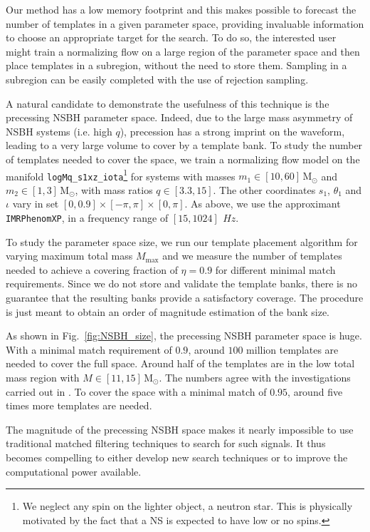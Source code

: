 \documentclass[twocolumn,showpacs,preprintnumbers,nofootinbib,prd,
superscriptaddress,10pt]{revtex4-2}
\begin{document}
Our method has a low memory footprint and this makes possible to forecast the number of templates in a given parameter space, providing invaluable information to choose an appropriate target for the search.
To do so, the interested user might train a normalizing flow on a large region of the parameter space and then place templates in a subregion, without the need to store them. Sampling in a subregion can be easily completed with the use of rejection sampling.

A natural candidate to demonstrate the usefulness of this technique is the precessing NSBH parameter space.
Indeed, due to the large mass asymmetry of NSBH systems (i.e. high $q$), precession has a strong imprint on the waveform, leading to a very large volume to cover by a template bank.
To study the number of templates needed to cover the space, we train a normalizing flow model on the manifold \texttt{logMq\_s1xz\_iota}\footnote{We neglect any spin on the lighter object, a neutron star. This is physically motivated by the fact that a NS is expected to have low or no spins.} for systems with masses $m_1 \in [10, 60]\,\mathrm{M_\odot}$ and  $m_2 \in [1, 3]\,\mathrm{M_\odot}$, with mass ratios $q \in [3.3, 15]$.
The other coordinates $s_\text{1}$, $\theta_\text{1}$ and $\iota$ vary in set $[0, 0.9]\times[-\pi, \pi]\times[0, \pi]$.
As above, we use the approximant \texttt{IMRPhenomXP}, in a frequency range of $[15, 1024]\,\SI{}{Hz}$.

To study the parameter space size, we run our template placement algorithm for varying maximum total mass $M_\text{max}$ and we measure the number of templates needed to achieve a covering fraction of $\eta = 0.9$ for different minimal match requirements.
Since we do not store and validate the template banks, there is no guarantee that the resulting banks provide a satisfactory coverage. The procedure is just meant to obtain an order of magnitude estimation of the bank size.

As shown in Fig.~\ref{fig:NSBH_size}, the precessing NSBH parameter space is huge. With a minimal match requirement of $0.9$, around $100$ million templates are needed to cover the full space. Around half of the templates are in the low total mass region with ${M \in [11,15]\,\mathrm{M_\odot}}$. The numbers agree with the investigations carried out in \cite{McIsaac:2023ijd}.
To cover the space with a minimal match of $0.95$, around five times more templates are needed.

The magnitude of the precessing NSBH space makes it nearly impossible to use traditional matched filtering techniques to search for such signals. It thus becomes compelling to either develop new search techniques \cite{McIsaac:2023ijd} or to improve the computational power available.
\end{document}

